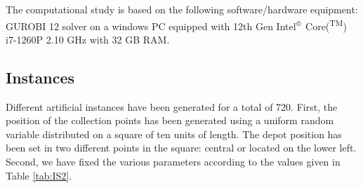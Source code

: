 \documentclass[authoryear,preprint,12pt]{elsarticle}
\begin{document}
The computational study is based on the following software/hardware equipment: GUROBI 12 solver on a windows PC equipped with 12th Gen Intel$^{\copyright}$ Core(\textsuperscript{TM}) i7-1260P   2.10 GHz with 32 GB RAM.

\subsection{Instances}\label{instances}

Different artificial instances have been generated for a total of 720. First, the position of the collection points has been generated using a uniform random variable distributed on a square of ten units of length. The depot position has been set in two different points in the square: central or located on the lower left.   
%
Second, we have fixed the various parameters according to the values given in Table \ref{tab:IS2}.
\end{document}
